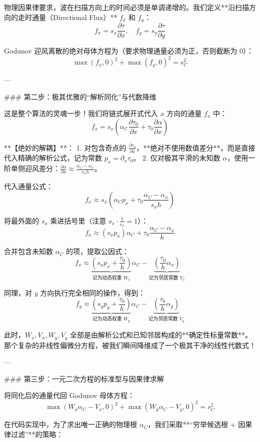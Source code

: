 \documentclass[12pt]{article}
\begin{document}
{物理因果律要求，波在扫描方向上的时间必须是单调递增的。我们定义**沿扫描方向的走时通量（Directional Flux）** $f_x$ 和 $f_y$：
$$ f_x = s_x \frac{\partial \tau}{\partial x}, \quad f_y = s_y \frac{\partial \tau}{\partial y} $$

Godunov 迎风离散的绝对母体方程为（要求物理通量必须为正，否则截断为 0）：
$$ \max(f_x, 0)^2 + \max(f_y, 0)^2 = s_C^2 $$

---

### 第二步：极其优雅的“解析同化”与代数降维

这是整个算法的灵魂一步！我们将链式展开式代入 $x$ 方向的通量 $f_x$ 中：
$$ f_x = s_x \left( \alpha_C \frac{\partial \tau_0}{\partial x} + \tau_0 \frac{\partial \alpha}{\partial x} \right) $$

**【绝妙的解耦】**：
1. 对包含奇点的 $\frac{\partial \tau_0}{\partial x}$，**绝对不使用数值差分**，而是直接代入精确的解析公式，记为常数 $p_x = \partial_x \tau_0$。
2. 仅对极其平滑的未知数 $\alpha$，使用一阶单侧迎风差分：$\frac{\partial \alpha}{\partial x} \approx \frac{\alpha_C - \alpha_x}{s_x h}$。

代入通量公式：
$$ f_x \approx s_x \left( \alpha_C p_x + \tau_0 \frac{\alpha_C - \alpha_x}{s_x h} \right) $$

将最外面的 $s_x$ 乘进括号里（注意 $s_x \cdot \frac{1}{s_x} = 1$）：
$$ f_x \approx (s_x p_x) \alpha_C + \tau_0 \frac{\alpha_C - \alpha_x}{h} $$

合并包含未知数 $\alpha_C$ 的项，提取公因式：
$$ f_x \approx \underbrace{\left( s_x p_x + \frac{\tau_0}{h} \right)}_{\text{记为动态权重 } W_x} \alpha_C - \underbrace{\left( \frac{\tau_0}{h} \alpha_x \right)}_{\text{记为邻居常数 } V_x} $$

同理，对 $y$ 方向执行完全相同的操作，得到：
$$ f_y \approx \underbrace{\left( s_y p_y + \frac{\tau_0}{h} \right)}_{\text{记为动态权重 } W_y} \alpha_C - \underbrace{\left( \frac{\tau_0}{h} \alpha_y \right)}_{\text{记为邻居常数 } V_y} $$

此时，$W_x, V_x, W_y, V_y$ 全部是由解析公式和已知邻居构成的**确定性标量常数**。那个复杂的非线性偏微分方程，被我们瞬间降维成了一个极其干净的线性代数式！

---

### 第三步：一元二次方程的标准型与因果律求解

将同化后的通量代回 Godunov 母体方程：
$$ \max(W_x \alpha_C - V_x, 0)^2 + \max(W_y \alpha_C - V_y, 0)^2 = s_C^2 $$

在代码实现中，为了求出唯一正确的物理根 $\alpha_C$，我们采取**“穷举候选根 + 因果律过滤”**的策略：

}
\end{document}
